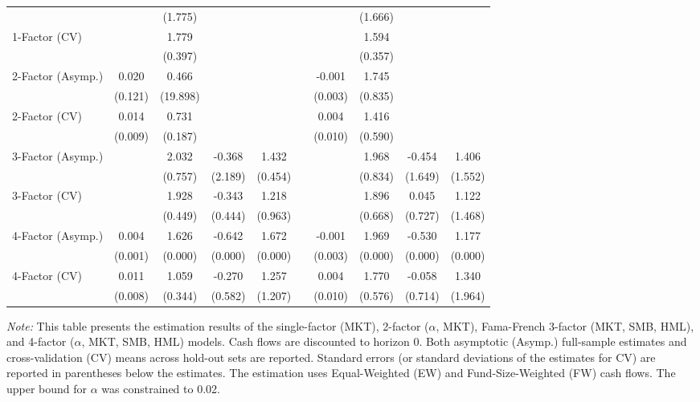 \begin{table}[ht]
{\begin{tabular}{l cccc c cccc}
 &  & (1.775) &  &  &  &  & (1.666) &  &  \\
1-Factor (CV) &  & 1.779 &  &  &  &  & 1.594 &  &  \\
 &  & (0.397) &  &  &  &  & (0.357) &  &  \\
2-Factor (Asymp.) & 0.020 & 0.466 &  &  &  & -0.001 & 1.745 &  &  \\
 & (0.121) & (19.898) &  &  &  & (0.003) & (0.835) &  &  \\
2-Factor (CV) & 0.014 & 0.731 &  &  &  & 0.004 & 1.416 &  &  \\
 & (0.009) & (0.187) &  &  &  & (0.010) & (0.590) &  &  \\
3-Factor (Asymp.) &  & 2.032 & -0.368 & 1.432 &  &  & 1.968 & -0.454 & 1.406 \\
 &  & (0.757) & (2.189) & (0.454) &  &  & (0.834) & (1.649) & (1.552) \\
3-Factor (CV) &  & 1.928 & -0.343 & 1.218 &  &  & 1.896 & 0.045 & 1.122 \\
 &  & (0.449) & (0.444) & (0.963) &  &  & (0.668) & (0.727) & (1.468) \\
4-Factor (Asymp.) & 0.004 & 1.626 & -0.642 & 1.672 &  & -0.001 & 1.969 & -0.530 & 1.177 \\
 & (0.001) & (0.000) & (0.000) & (0.000) &  & (0.003) & (0.000) & (0.000) & (0.000) \\
4-Factor (CV) & 0.011 & 1.059 & -0.270 & 1.257 &  & 0.004 & 1.770 & -0.058 & 1.340 \\
 & (0.008) & (0.344) & (0.582) & (1.207) &  & (0.010) & (0.576) & (0.714) & (1.964) \\
\hline
\end{tabular}
}
\par
\vspace{1ex}
\raggedright \footnotesize \textit{Note:} This table presents the estimation results of the single-factor (MKT), 2-factor ($\alpha$, MKT), Fama-French 3-factor (MKT, SMB, HML), and 4-factor ($\alpha$, MKT, SMB, HML) models. Cash flows are discounted to horizon 0. Both asymptotic (Asymp.) full-sample estimates and cross-validation (CV) means across hold-out sets are reported. Standard errors (or standard deviations of the estimates for CV) are reported in parentheses below the estimates. The estimation uses Equal-Weighted (EW) and Fund-Size-Weighted (FW) cash flows. The upper bound for $\alpha$ was constrained to 0.02.
\end{table}
